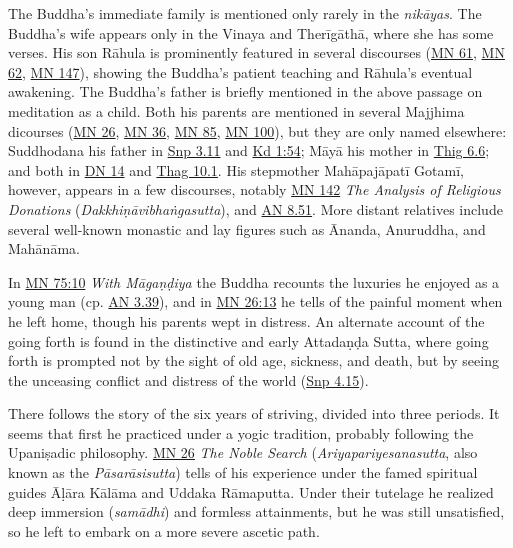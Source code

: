 \documentclass[12pt,openany]{book}%
\begin{document}
The Buddha’s immediate family is mentioned only rarely in the \textit{\textsanskrit{nikāyas}}. The Buddha’s wife appears only in the Vinaya and \textsanskrit{Therīgāthā}, where she has some verses. His son \textsanskrit{Rāhula} is prominently featured in several discourses (\href{https://suttacentral.net/mn61}{MN 61}, \href{https://suttacentral.net/mn62}{MN 62}, \href{https://suttacentral.net/mn147}{MN 147}), showing the Buddha’s patient teaching and \textsanskrit{Rāhula}’s eventual awakening. The Buddha’s father is briefly mentioned in the above passage on meditation as a child. Both his parents are mentioned in several Majjhima dicourses (\href{https://suttacentral.net/mn26}{MN 26}, \href{https://suttacentral.net/mn36}{MN 36}, \href{https://suttacentral.net/mn85}{MN 85}, \href{https://suttacentral.net/mn100}{MN 100}), but they are only named elsewhere: Suddhodana his father in \href{https://suttacentral.net/snp3.11}{Snp 3.11} and \href{https://suttacentral.net/pli{-}tv{-}kd1.\#54}{Kd 1:54}; \textsanskrit{Māyā} his mother in \href{https://suttacentral.net/thig6.6}{Thig 6.6}; and both in \href{https://suttacentral.net/dn14}{DN 14} and \href{https://suttacentral.net/thag10.1}{Thag 10.1}. His stepmother \textsanskrit{Mahāpajāpatī} \textsanskrit{Gotamī}, however, appears in a few discourses, notably \href{https://suttacentral.net/mn142}{MN 142} \textit{The Analysis of Religious Donations} (\textit{\textsanskrit{Dakkhiṇāvibhaṅgasutta}}), and \href{https://suttacentral.net/an8.51}{AN 8.51}. More distant relatives include several well-known monastic and lay figures such as Ānanda, Anuruddha, and \textsanskrit{Mahānāma}.

In \href{https://suttacentral.net/mn75\#10}{MN 75:10} \textit{With \textsanskrit{Māgaṇḍiya}} the Buddha recounts the luxuries he enjoyed as a young man (cp. \href{https://suttacentral.net/an3.39}{AN 3.39}), and in \href{https://suttacentral.net/mn26\#13}{MN 26:13} he tells of the painful moment when he left home, though his parents wept in distress. An alternate account of the going forth is found in the distinctive and early \textsanskrit{Attadaṇḍa} Sutta, where going forth is prompted not by the sight of old age, sickness, and death, but by seeing the unceasing conflict and distress of the world (\href{https://suttacentral.net/snp4.15}{Snp 4.15}).

There follows the story of the six years of striving, divided into three periods. It seems that first he practiced under a yogic tradition, probably following the \textsanskrit{Upaniṣadic} philosophy. \href{https://suttacentral.net/mn26}{MN 26} \textit{The Noble Search} (\textit{Ariyapariyesanasutta}, also known as the \textit{\textsanskrit{Pāsarāsisutta}}) tells of his experience under the famed spiritual guides \textsanskrit{Āḷāra} \textsanskrit{Kālāma} and Uddaka \textsanskrit{Rāmaputta}. Under their tutelage he realized deep immersion (\textit{\textsanskrit{samādhi}}) and formless attainments, but he was still unsatisfied, so he left to embark on a more severe ascetic path.
\end{document}
